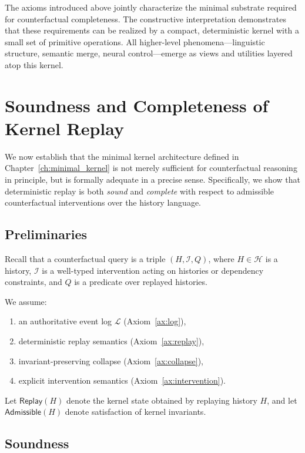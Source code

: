 \documentclass[11pt]{article}
\begin{document}
The axioms introduced above jointly characterize the minimal substrate required for counterfactual completeness. The constructive interpretation demonstrates that these requirements can be realized by a compact, deterministic kernel with a small set of primitive operations. All higher-level phenomena—linguistic structure, semantic merge, neural control—emerge as views and utilities layered atop this kernel.

\section{Soundness and Completeness of Kernel Replay}
\label{sec:sound_complete}

We now establish that the minimal kernel architecture defined in Chapter~\ref{ch:minimal_kernel} is not merely sufficient for counterfactual reasoning in principle, but is formally adequate in a precise sense. Specifically, we show that deterministic replay is both \emph{sound} and \emph{complete} with respect to admissible counterfactual interventions over the history language.

\subsection{Preliminaries}

Recall that a counterfactual query is a triple $(H,\mathcal{I},Q)$, where $H \in \mathcal{H}$ is a history, $\mathcal{I}$ is a well-typed intervention acting on histories or dependency constraints, and $Q$ is a predicate over replayed histories.

We assume:
\begin{enumerate}
  \item an authoritative event log $\mathcal{L}$ (Axiom~\ref{ax:log}),
  \item deterministic replay semantics (Axiom~\ref{ax:replay}),
  \item invariant-preserving collapse (Axiom~\ref{ax:collapse}),
  \item explicit intervention semantics (Axiom~\ref{ax:intervention}).
\end{enumerate}

Let $\mathsf{Replay}(H)$ denote the kernel state obtained by replaying history $H$, and let $\mathsf{Admissible}(H)$ denote satisfaction of kernel invariants.

\subsection{Soundness}
\end{document}
